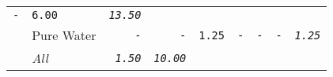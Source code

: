 \documentclass[11pt,A4paper,]{article}
\begin{document}
\begin{longtable}[]{@{}llrrrrrrr@{}}
\begin{minipage}[t]{0.11\columnwidth}
\texttt{-}\strut
\end{minipage} & \begin{minipage}[t]{0.11\columnwidth}\raggedleft\strut
\texttt{6.00}\strut
\end{minipage} & \begin{minipage}[t]{0.11\columnwidth}\raggedleft\strut
\emph{\texttt{13.50}}\strut
\end{minipage}\tabularnewline
\begin{minipage}[t]{0.11\columnwidth}\raggedright\strut
\strut
\end{minipage} & \begin{minipage}[t]{0.11\columnwidth}\raggedright\strut
Pure Water\strut
\end{minipage} & \begin{minipage}[t]{0.11\columnwidth}\raggedleft\strut
\texttt{-}\strut
\end{minipage} & \begin{minipage}[t]{0.11\columnwidth}\raggedleft\strut
\texttt{-}\strut
\end{minipage} & \begin{minipage}[t]{0.11\columnwidth}\raggedleft\strut
\texttt{1.25}\strut
\end{minipage} & \begin{minipage}[t]{0.11\columnwidth}\raggedleft\strut
\texttt{-}\strut
\end{minipage} & \begin{minipage}[t]{0.11\columnwidth}\raggedleft\strut
\texttt{-}\strut
\end{minipage} & \begin{minipage}[t]{0.11\columnwidth}\raggedleft\strut
\texttt{-}\strut
\end{minipage} & \begin{minipage}[t]{0.11\columnwidth}\raggedleft\strut
\emph{\texttt{1.25}}\strut
\end{minipage}\tabularnewline
\begin{minipage}[t]{0.11\columnwidth}\raggedright\strut
\strut
\end{minipage} & \begin{minipage}[t]{0.11\columnwidth}\raggedright\strut
\emph{All}\strut
\end{minipage} & \begin{minipage}[t]{0.11\columnwidth}\raggedleft\strut
\emph{\texttt{1.50}}\strut
\end{minipage} & \begin{minipage}[t]{0.11\columnwidth}\raggedleft\strut
\emph{\texttt{10.00}}\strut

\end{minipage}
\end{longtable}
\end{document}
